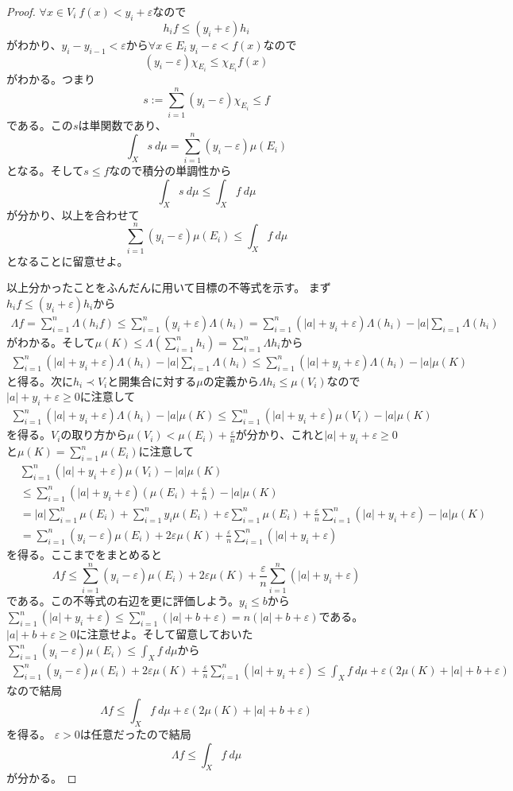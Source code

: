 \documentclass[leqno]{jsarticle}
\newcommand{\dpst}{\displaystyle}
\newcommand{\la}{\Lambda}
\newcommand{\ep}{\varepsilon}
\begin{document}
\begin{proof}
$\forall x\in V_i\ f(x)<y_i+\ep$なので
\[
h_if\le (y_i+\ep)h_i
\]
がわかり、$y_i-y_{i-1}<\ep$から$\forall x\in E_i\ y_i-\ep <f(x)$なので
\[
(y_i-\ep)\chi_{E_i}\le \chi_{E_i}f(x)
\]
がわかる。つまり
\[
s:=\sum_{i=1}^n(y_i-\ep)\chi_{E_i}\le  f
\]
である。この$s$は単関数であり、
\[
\int_{X}s \ d\mu=\sum_{i=1}^n(y_i-\ep)\mu(E_i) 
\]
となる。そして$s\le f$なので積分の単調性から
\[
\int_X s\ d\mu \le \int_X f\ d\mu
\]
が分かり、以上を合わせて
\[
\sum_{i=1}^n(y_i-\ep)\mu(E_i)\le \int_X f\ d\mu
\]
となることに留意せよ。\par
以上分かったことをふんだんに用いて目標の不等式を示す。
まず$h_if\le (y_i+\ep)h_i$から
\begin{eqnarray*}
\la f=\sum_{i=1}^n \la (h_if)\le \sum_{i=1}^n(y_i+\ep)\la (h_i)=\sum_{i=1}^n(|a|+y_i+\ep)\la (h_i)-|a|\sum_{i=1}\la (h_i)
\end{eqnarray*}
がわかる。そして$\dpst \mu(K)\le \la\left(\sum_{i=1}^{n}h_i\right)=\sum_{i=1}^n\la h_i$から
\begin{eqnarray*}\sum_{i=1}^n(|a|+y_i+\ep)\la (h_i)-|a|\sum_{i=1}\la (h_i)
\le \sum_{i=1}^n(|a|+y_i+\ep)\la (h_i)-|a|\mu(K)
\end{eqnarray*}
と得る。次に$h_i\prec V_i$と開集合に対する$\mu$の定義から$\la h_i\le \mu(V_i)$なので$|a|+y_i+\ep\ge 0$に注意して
\begin{eqnarray*}\sum_{i=1}^n(|a|+y_i+\ep)\la (h_i)-|a|\mu(K)
\le \sum_{i=1}^n(|a|+y_i+\ep)\mu(V_i)-|a|\mu(K)
\end{eqnarray*}
を得る。$V_i$の取り方から$\dpst \mu(V_i)<\mu(E_i)+\frac{\ep}{n}$が分かり、これと$|a|+y_i+\ep\ge 0$と$\dpst \mu(K)=\sum_{i=1}^n\mu(E_i)$に注意して
\begin{align*}
&\sum_{i=1}^n(|a|+y_i+\ep)\mu(V_i)-|a|\mu(K)\\
&\le \sum_{i=1}^n(|a|+y_i+\ep)(\mu(E_i)+\frac{\ep}{n})-|a|\mu(K)\\
&= |a|\sum_{i=1}^n\mu(E_i)+\sum_{i=1}^ny_i\mu(E_i)+\ep\sum_{i=1}^n\mu(E_i)+\frac{\ep}{n}\sum_{i=1}^n(|a|+y_i+\ep)-|a|\mu(K)\\
&=\sum_{i=1}^n(y_i-\ep)\mu(E_i)+2\ep\mu(K)+\frac{\ep}{n}\sum_{i=1}^n(|a|+y_i+\ep)
\end{align*}
を得る。ここまでをまとめると
\[
\la f\le\sum_{i=1}^n(y_i-\ep)\mu(E_i)+2\ep\mu(K)+\frac{\ep}{n}\sum_{i=1}^n(|a|+y_i+\ep) 
\]
である。この不等式の右辺を更に評価しよう。$y_i\le b$から$\dpst \sum_{i=1}^n(|a|+y_i+\ep)\le \sum_{i=1}^n(|a|+b+\ep)=n(|a|+b+\ep)$である。$|a|+b+\ep\ge 0$に注意せよ。そして留意しておいた$\dpst \sum_{i=1}^n(y_i-\ep)\mu(E_i)\le \int_X f\ d\mu$から
\begin{eqnarray*}
\sum_{i=1}^n(y_i-\ep)\mu(E_i)+2\ep\mu(K)+\frac{\ep}{n}\sum_{i=1}^n(|a|+y_i+\ep)
\le\int_Xf\ d\mu +\ep(2\mu(K)+|a|+b+\ep)
\end{eqnarray*}
なので結局
\[
\la f \le \int_Xf\ d\mu +\ep(2\mu(K)+|a|+b+\ep)
\]
を得る。
$\ep>0$は任意だったので結局
\[
\la f\le\int_Xf\ d\mu
\]が分かる。
\end{proof}
\end{document}
